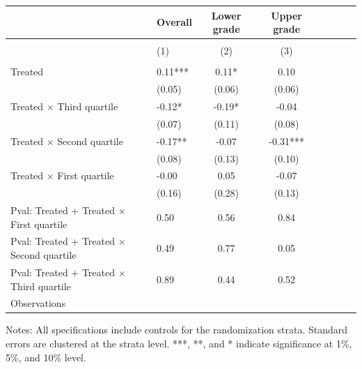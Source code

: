 \begin{center} 
\caption{\small Differential effect of baseline achievement quartiles} 
\label{tab:descriptives} 
\begin{small}
\begin{threeparttable}
\begin{tabular} {@{} l l c c c c c c  @{}} \toprule \toprule
& Overall & Lower grade & Upper grade \\ \midrule \\
& (1) & (2) & (3) \\ \midrule 
\\
 Treated      &  0.11***  &  0.11*  &  0.10   \\
             &  (0.05)  &  (0.06)  &  (0.06)   \\
 Treated $\times$ Third quartile      &  -0.12*  &  -0.19*  &  -0.04   \\
             &  (0.07)  &  (0.11)  &  (0.08)   \\
 Treated $\times$ Second quartile      &  -0.17**  &  -0.07  &  -0.31***   \\
             &  (0.08)  &  (0.13)  &  (0.10)   \\
 Treated $\times$ First quartile      &  -0.00  &  0.05  &  -0.07   \\
             &  (0.16)  &  (0.28)  &  (0.13)   \\
\midrule
Pval: Treated + Treated $\times$ First quartile     &  0.50  &  0.56  &  0.84   \\
Pval: Treated + Treated $\times$ Second quartile     &  0.49  &  0.77  &  0.05   \\
Pval: Treated + Treated $\times$ Third quartile     &  0.89  &  0.44  &  0.52   \\
Observations   \\
\bottomrule
\end{tabular}
\begin{tablenotes}
\item Notes: All specifications include controls for the randomization strata. Standard errors are clustered at the strata level.  ***, **, and * indicate significance at 1\%, 5\%, and 10\% level. \end{tablenotes}
\end{threeparttable}
\end{small}
\end{center}
\clearpage
